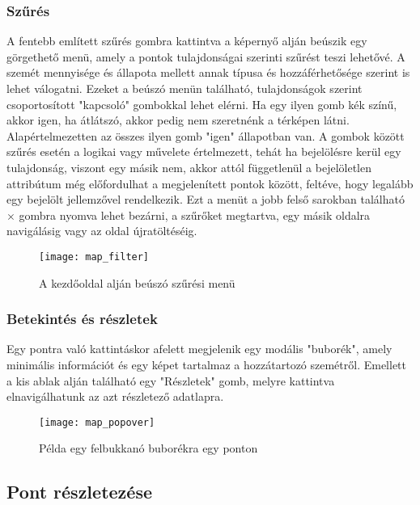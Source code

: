 \subsubsection{Szűrés}

A fentebb említett szűrés gombra kattintva a képernyő alján beúszik egy görgethető menü, amely a pontok tulajdonságai szerinti szűrést teszi lehetővé. A szemét mennyisége és állapota mellett annak típusa és hozzáférhetősége szerint is lehet válogatni. Ezeket a beúszó menün található, tulajdonságok szerint csoportosított "kapcsoló" gombokkal lehet elérni. Ha egy ilyen gomb kék színű, akkor igen, ha átlátszó, akkor pedig nem szeretnénk a térképen látni. Alapértelmezetten az összes ilyen gomb "igen" állapotban van. A gombok között szűrés esetén a logikai vagy művelete értelmezett, tehát ha bejelölésre kerül egy tulajdonság, viszont egy másik nem, akkor attól függetlenül a bejelöletlen attribútum még előfordulhat a megjelenített pontok között, feltéve, hogy legalább egy bejelölt jellemzővel rendelkezik. Ezt a menüt a jobb felső sarokban található \hspace{0.1cm}\boldmath\(\times\)\hspace{0.1cm} gombra nyomva lehet bezárni, a szűrőket megtartva, egy másik oldalra navigálásig vagy az oldal újratöltéséig.

\begin{figure}[H]
	\centering
	\texttt{[image: map\_filter]}
	\caption{A kezdőoldal alján beúszó szűrési menü}
	\label{fig:map_filter}
\end{figure}

\subsubsection{Betekintés és részletek}

Egy pontra való kattintáskor afelett megjelenik egy modális "buborék", amely minimális információt és egy képet tartalmaz a hozzátartozó szemétről. Emellett a kis ablak alján található egy "Részletek" gomb, melyre kattintva elnavigálhatunk az azt részletező adatlapra.

\begin{figure}[H]
	\centering
	\texttt{[image: map\_popover]}
	\caption{Példa egy felbukkanó buborékra egy ponton}
	\label{fig:map_popover}
\end{figure}

\subsection{Pont részletezése}
\label{subsec:trash_details}

